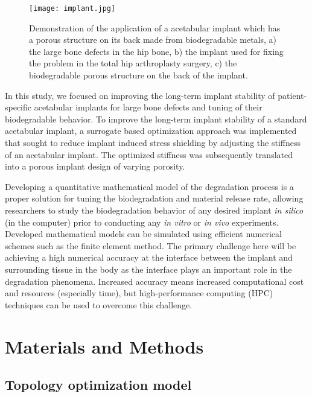 \begin{figure}[h]
\centering
\medskip
\texttt{[image: implant.jpg]}
\caption[Application of the acetabular implant]{Demonstration of the application of a acetabular implant which has a porous structure on its back made from biodegradable metals, a) the large bone defects in the hip bone, b) the implant used for fixing the problem in the total hip arthroplasty surgery, c) the biodegradable porous structure on the back of the implant. } \label{fig:cup_implant}
\end{figure}

In this study, we focused on improving the long-term implant stability of patient-specific acetabular implants for large bone defects and tuning of their biodegradable behavior. To improve the long-term implant stability of a standard acetabular implant, a surrogate based optimization approach was implemented that sought to reduce implant induced stress shielding by adjusting the stiffness of an acetabular implant.  The optimized stiffness was subsequently translated into a porous implant design of varying porosity.

Developing a quantitative mathematical model of the degradation process is a proper solution for tuning the biodegradation and material release rate, allowing researchers to study the biodegradation behavior of any desired implant \textit{in silico} (in the computer) prior to conducting any \textit{in vitro} or \textit{in vivo} experiments. Developed mathematical models can be simulated using efficient numerical schemes such as the finite element method. The primary challenge here will be achieving a high numerical accuracy at the interface between the implant and surrounding tissue in the body as the interface plays an important role in the degradation phenomena. Increased accuracy means increased computational cost and resources (especially time), but high-performance computing (HPC) techniques can be used to overcome this challenge.



\section{Materials and Methods}

\subsection{Topology optimization model}

